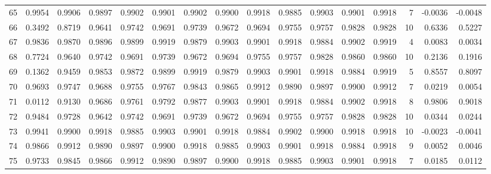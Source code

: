 \begin{tabular}{lrrrrrrrrrrrrrrr}
65  &      0.9954 &  0.9906 &  0.9897 &  0.9902 &  0.9901 &  0.9902 &  0.9900 &  0.9918 &  0.9885 &  0.9903 &   0.9901 &     0.9918 &      7 &                   -0.0036 &                    -0.0048 \\
66  &      0.3492 &  0.8719 &  0.9641 &  0.9742 &  0.9691 &  0.9739 &  0.9672 &  0.9694 &  0.9755 &  0.9757 &   0.9828 &     0.9828 &     10 &                    0.6336 &                     0.5227 \\
67  &      0.9836 &  0.9870 &  0.9896 &  0.9899 &  0.9919 &  0.9879 &  0.9903 &  0.9901 &  0.9918 &  0.9884 &   0.9902 &     0.9919 &      4 &                    0.0083 &                     0.0034 \\
68  &      0.7724 &  0.9640 &  0.9742 &  0.9691 &  0.9739 &  0.9672 &  0.9694 &  0.9755 &  0.9757 &  0.9828 &   0.9860 &     0.9860 &     10 &                    0.2136 &                     0.1916 \\
69  &      0.1362 &  0.9459 &  0.9853 &  0.9872 &  0.9899 &  0.9919 &  0.9879 &  0.9903 &  0.9901 &  0.9918 &   0.9884 &     0.9919 &      5 &                    0.8557 &                     0.8097 \\
70  &      0.9693 &  0.9747 &  0.9688 &  0.9755 &  0.9767 &  0.9843 &  0.9865 &  0.9912 &  0.9890 &  0.9897 &   0.9900 &     0.9912 &      7 &                    0.0219 &                     0.0054 \\
71  &      0.0112 &  0.9130 &  0.9686 &  0.9761 &  0.9792 &  0.9877 &  0.9903 &  0.9901 &  0.9918 &  0.9884 &   0.9902 &     0.9918 &      8 &                    0.9806 &                     0.9018 \\
72  &      0.9484 &  0.9728 &  0.9642 &  0.9742 &  0.9691 &  0.9739 &  0.9672 &  0.9694 &  0.9755 &  0.9757 &   0.9828 &     0.9828 &     10 &                    0.0344 &                     0.0244 \\
73  &      0.9941 &  0.9900 &  0.9918 &  0.9885 &  0.9903 &  0.9901 &  0.9918 &  0.9884 &  0.9902 &  0.9900 &   0.9918 &     0.9918 &     10 &                   -0.0023 &                    -0.0041 \\
74  &      0.9866 &  0.9912 &  0.9890 &  0.9897 &  0.9900 &  0.9918 &  0.9885 &  0.9903 &  0.9901 &  0.9918 &   0.9884 &     0.9918 &      9 &                    0.0052 &                     0.0046 \\
75  &      0.9733 &  0.9845 &  0.9866 &  0.9912 &  0.9890 &  0.9897 &  0.9900 &  0.9918 &  0.9885 &  0.9903 &   0.9901 &     0.9918 &      7 &                    0.0185 &                     0.0112 \\

\end{tabular}
